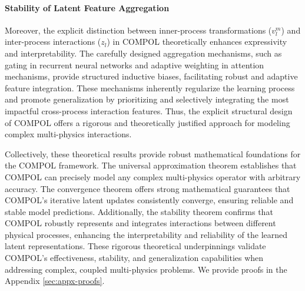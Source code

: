\paragraph{Stability of Latent Feature Aggregation} Moreover, the explicit distinction between inner-process transformations ($v_l^m$) and inter-process interactions ($z_l$) in COMPOL theoretically enhances expressivity and interpretability. The carefully designed aggregation mechanisms, such as gating in recurrent neural networks and adaptive weighting in attention mechanisms, provide structured inductive biases, facilitating robust and adaptive feature integration. These mechanisms inherently regularize the learning process and promote generalization by prioritizing and selectively integrating the most impactful cross-process interaction features. Thus, the explicit structural design of COMPOL offers a rigorous and theoretically justified approach for modeling complex multi-physics interactions.

Collectively, these theoretical results provide robust mathematical foundations for the COMPOL framework. The universal approximation theorem establishes that COMPOL can precisely model any complex multi-physics operator with arbitrary accuracy. The convergence theorem offers strong mathematical guarantees that COMPOL's iterative latent updates consistently converge, ensuring reliable and stable model predictions. Additionally, the stability theorem confirms that COMPOL robustly represents and integrates interactions between different physical processes, enhancing the interpretability and reliability of the learned latent representations. These rigorous theoretical underpinnings validate COMPOL's effectiveness, stability, and generalization capabilities when addressing complex, coupled multi-physics problems. We provide proofs in the Appendix \ref{sec:appx-proofs}.

